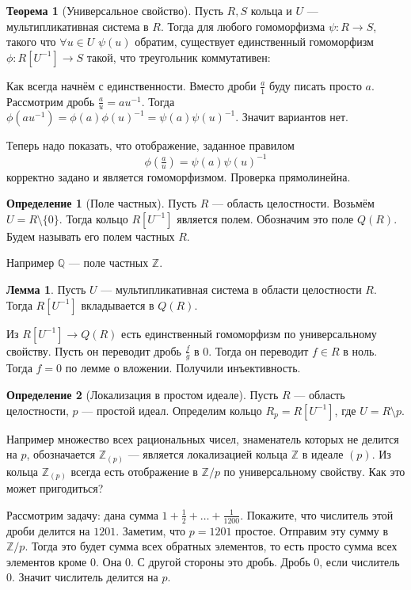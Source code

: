 \documentclass[10pt,a4paper,oneside]{book}
\theoremstyle{definition}
\newtheorem{defn}{Определение}
\newtheorem{thm}{Теорема}
\newtheorem{lem}{Лемма}
\newcommand{\mb}[1]{\mathbb{#1}}
\def\thrm{\begin{thm}}
\def\ethrm{\end{thm}}
\def\dfn{\begin{defn}}
\def\edfn{\end{defn}}
\def\lm{\begin{lem}}
\def\elm{\end{lem}}
\begin{document}
\thrm[Универсальное свойство] Пусть $R,S$ кольца и $U$ --- мультипликативная система в $R$. Тогда для любого гомоморфизма $\psi \colon R\to S$, такого что $\forall u\in U \,\,\psi(u)$ обратим, существует единственный гомоморфизм $\phi\colon R[U^{-1} ] \to S$ такой, что треугольник коммутативен:
\begin{center}
\end{center}
\ethrm
\proof
Как всегда начнём с единственности. Вместо дроби $\tfrac{a}{1}$ буду писать просто $a$. Рассмотрим дробь $\tfrac{a}{u}=au^{-1}$. Тогда $\phi(au^{-1})=\phi(a)\phi(u)^{-1}=\psi(a)\psi(u)^{-1}$. Значит вариантов нет.

Теперь надо показать, что отображение, заданное правилом
$$\phi(\tfrac{a}{u})=\psi(a)\psi(u)^{-1}$$
корректно задано и является гомоморфизмом. Проверка прямолинейна.
\endproof

\dfn[Поле частных] Пусть $R$ --- область целостности. Возьмём $U=R\setminus \{0\}$. Тогда кольцо $R[U^{-1}]$ является полем. Обозначим это поле $Q(R)$. Будем называть его полем частных $R$.
\edfn

Например $\mb Q$ --- поле частных $\mb Z$.

\lm Пусть $U$ --- мультипликативная система в области целостности $R$. Тогда $R[U^{-1}]$ вкладывается в $Q(R)$.
\elm
\proof
Из $R[U^{-1}]\to Q(R)$ есть единственный гомоморфизм по универсальному свойству. Пусть он переводит дробь $\frac{f}{g}$ в $0$. Тогда он переводит $f\in R$ в ноль. Тогда $f=0$ по лемме о вложении. Получили инъективность.
\endproof

\dfn[Локализация в простом идеале] Пусть $R$  --- область целостности, $p$ --- простой идеал. Определим кольцо $R_p= R[U^{-1}]$, где $U=R\setminus p$.
\edfn

Например множество всех рациональных чисел, знаменатель которых не делится на $p$, обозначается $\mb Z_{(p)}$ --- является локализацией кольца $\mb Z$ в идеале $(p)$. Из кольца $\mb Z_{(p)}$ всегда есть отображение в $\mb Z/p$ по универсальному свойству. Как это может пригодиться?

Рассмотрим задачу: дана сумма $1+\frac{1}{2}+\dots+\frac{1}{1200}$. Покажите, что числитель этой дроби делится на $1201$. Заметим, что $p=1201$ простое. Отправим эту сумму в $\mb Z/p$. Тогда это будет сумма всех обратных элементов, то есть просто сумма всех элементов кроме 0. Она 0. С другой стороны это дробь. Дробь 0, если числитель 0. Значит числитель делится на $p$.
\end{document}
